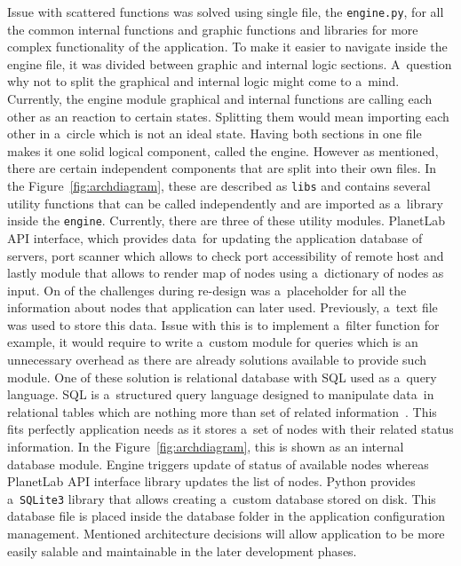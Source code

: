 Issue with scattered functions was solved using single file, the \texttt{engine.py}, for all the common internal functions and graphic functions and libraries for more complex functionality of the application. To make it easier to navigate inside the engine file, it was divided between graphic and internal logic sections. A~question why not to split the graphical and internal logic might come to a~mind. Currently, the engine module graphical and internal functions are calling each other as an reaction to certain states. Splitting them would mean importing each other in a~circle which is not an ideal state. Having both sections in one file makes it one solid logical component, called the engine. However as mentioned, there are certain independent components that are split into their own files. In the Figure~\ref{fig:archdiagram}, these are described as \texttt{libs} and contains several utility functions that can be called independently and are imported as a~library inside the \texttt{engine}. Currently, there are three of these utility modules. PlanetLab API interface, which provides data~for updating the application database of servers, port scanner which allows to check port accessibility of remote host and lastly module that allows to render map of nodes using a~dictionary of nodes as input. On of the challenges during re-design was a~placeholder for all the information about nodes that application can later used. Previously, a~text file was used to store this data. Issue with this is to implement a~filter function for example, it would require to write a~custom module for queries which is an unnecessary overhead as there are already solutions available to provide such module. One of these solution is relational database with SQL used as a~query language. SQL is a~structured query language designed to manipulate data~in relational tables which are nothing more than set of related information~\cite{Beaulieu:2005:LS:1098720}. This fits perfectly application needs as it stores a~set of nodes with their related status information. In the Figure~\ref{fig:archdiagram}, this is shown as an internal database module. Engine triggers update of status of available nodes whereas PlanetLab API interface library updates the list of nodes. Python provides a~\texttt{SQLite3} library that allows creating a~custom database stored on disk. This database file is placed inside the database folder in the application configuration management. Mentioned architecture decisions will allow application to be more easily salable and maintainable in the later development phases.\\

